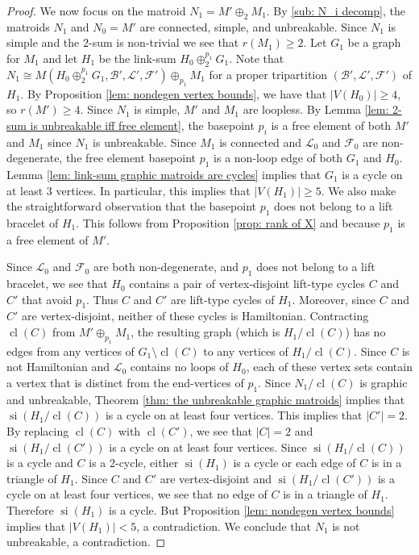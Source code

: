 \documentclass[12pt]{article}
\theoremstyle{definition}
\theoremstyle{plain} %
\newcommand{\cB}{\mathcal{B}}
\newcommand{\cF}{\mathcal{F}}
\newcommand{\cL}{\mathcal{L}}
\DeclareMathOperator{\si}{si}
\DeclareMathOperator{\cl}{cl}
\newcommand{\del}{\!\setminus\!}
\begin{document}
\begin{proof}
    We now focus on the matroid $N_1=M'\oplus_2M_1$. By \ref{sub: N_i decomp}, the matroids $N_1$ and $N_0=M'$ are connected, simple, and unbreakable. 
    Since $N_1$ is simple and the $2$-sum is non-trivial we see that $r(M_1) \ge 2$.
    Let $G_1$ be a graph for $M_1$ and let $H_1$ be the link-sum $H_0\oplus_2^{p_1}G_1$. Note that $N_1\cong M(H_0\oplus_2^{p_1}G_1,\cB',\cL',\cF')\oplus_{p_1}M_1$ for a proper tripartition $(\cB',\cL',\cF')$ of $H_1$. By Proposition \ref{lem: nondegen vertex bounds}, we have that $\lvert V(H_0)\rvert\geq4$, so $r(M')\geq4$. Since $N_1$ is simple, $M'$ and $M_1$ are loopless.
    By Lemma \ref{lem: 2-sum is unbreakable iff free element}, the basepoint $p_i$ is a free element of both $M'$ and $M_1$ since $N_1$ is unbreakable. Since $M_1$ is connected and $\cL_0$ and $\cF_0$ are non-degenerate, the free element basepoint $p_1$ is a non-loop edge of both $G_1$ and $H_0$. Lemma \ref{lem: link-sum graphic matroids are cycles} implies that $G_1$ is a cycle on at least 3 vertices. In particular, this implies that $\lvert V(H_1)\rvert\geq5$. We also make the straightforward observation that the basepoint $p_1$ does not belong to a lift bracelet of $H_1$. This follows from Proposition \ref{prop: rank of X} and because $p_1$ is a free element of $M'$.

    Since $\cL_0$ and $\cF_0$ are both non-degenerate, and $p_1$ does not belong to a lift bracelet, we see that $H_0$ contains a pair of vertex-disjoint lift-type cycles $C$ and $C'$ that avoid $p_1$. Thus $C$ and $C'$ are lift-type cycles of $H_1$. Moreover, since $C$ and $C'$ are vertex-disjoint, neither of these cycles is Hamiltonian. Contracting $\cl(C)$ from $M'\oplus_{p_1}M_1$, the resulting graph (which is $H_1/\cl(C)$) has no edges from any vertices of $G_1\del\cl(C)$ to any vertices of $H_1/\cl(C)$. Since $C$ is not Hamiltonian and $\cL_0$ contains no loops of $H_0$, each of these vertex sets contain a vertex that is distinct from the end-vertices of $p_1$. Since $N_1/\cl(C)$ is graphic and unbreakable, Theorem \ref{thm: the unbreakable graphic matroids} implies that $\si(H_1/\cl(C))$ is a cycle on at least four vertices. This implies that $\lvert C'\rvert=2$. By replacing $\cl(C)$ with $\cl(C')$, we see that $\lvert C\rvert=2$ and $\si(H_1/\cl(C'))$ is a cycle on at least four vertices. 
    Since $\si(H_1/\cl(C))$ is a cycle and $C$ is a 2-cycle, either $\si(H_1)$ is a cycle or each edge of $C$ is in a triangle of $H_1$.
    Since $C$ and $C'$ are vertex-disjoint and $\si(H_1/\cl(C'))$ is a cycle on at least four vertices, we see that no edge of $C$ is in a triangle of $H_1$.
    Therefore $\si(H_1)$ is a cycle.
    But Proposition \ref{lem: nondegen vertex bounds} implies that $\lvert V(H_1)\rvert<5$, a contradiction. We conclude that $N_1$ is not unbreakable, a contradiction.
    \end{proof}
\end{document}
